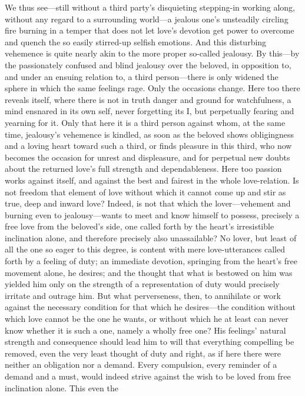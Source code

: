 \documentclass[12pt,a4paper]{book}
\begin{document}
We thus see---still without a third party's disquieting stepping-in working
along, without any regard to a surrounding world---a jealous one's
unsteadily circling fire burning in a temper that does not let love's
devotion get power to overcome and quench the so easily stirred-up selfish
emotions. And this disturbing vehemence is quite nearly akin to the more
proper so-called jealousy. By this---by the passionately confused and blind
jealousy over the beloved, in opposition to, and under an ensuing relation
to, a third person---there is only widened the sphere in which the same
feelings rage. Only the occasions change. Here too there reveals itself,
where there is not in truth danger and ground for watchfulness, a mind
ensnared in its own self, never forgetting its I, but perpetually fearing
and yearning for it. Only that here it is a third person against whom, at
the same time, jealousy's vehemence is kindled, as soon as the beloved
shows obligingness and a loving heart toward such a third, or finds
pleasure in this third, who now becomes the occasion for unrest and
displeasure, and for perpetual new doubts about the returned love's full
strength and dependableness. Here too passion works against itself, and
against the best and fairest in the whole love-relation.
Is not freedom that element of love without which it cannot come up and
stir as true, deep and inward love? Indeed, is not that which the
lover---vehement and burning even to jealousy---wants to meet and know
himself to possess, precisely a free love from the beloved's side, one
called forth by the heart's irresistible inclination alone, and therefore
precisely also unassailable? No lover, but least of all the one so eager to
this degree, is content with mere love-utterances called forth by a feeling
of duty; an immediate devotion, springing from the heart's free movement
alone, he desires; and the thought that what is bestowed on him was yielded
him only on the strength of a representation of duty would precisely
irritate and outrage him. But what perverseness, then, to annihilate or
work against the necessary condition for that which he desires---the
condition without which love cannot be the one he wants, or without which
he at least can never know whether it is such a one, namely a wholly free
one? His feelings' natural strength and consequence should lead him to will
that everything compelling be removed, even the very least thought of duty
and right, as if here there were neither an obligation nor a demand. Every
compulsion, every reminder of a demand and a must, would indeed strive
against the wish to be loved from free inclination alone. This even the
\end{document}
